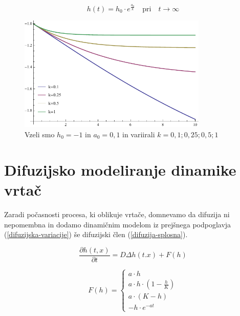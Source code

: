 \documentclass[a4paper, oneside, 12pt]{book}
\begin{document}
          \begin{equation}
            h(t) = h_0 \cdot e^{\frac{a_0}{k}} \quad \text{pri} \quad t \rightarrow \infty
            \label{dinamicna-gompertzova-limita}
          \end{equation}

            \begin{figure}[H]
              \begin{center}
                \includegraphics[width=9cm]{slike/gompertzova-rast}
              \end{center}
              \caption{Vzeli smo $h_0=-1$ in $a_0=0,1$ in variirali $k=0,1;0,25;0,5;1$}
              \label{fig:gompertzova-rast}
            \end{figure}

            \section{Difuzijsko modeliranje dinamike vrtač}

            Zaradi počasnosti procesa, ki oblikuje vrtače, domnevamo da difuzija ni nepomembna in dodamo dinamičnim modelom iz prejšnega podpoglavja  (\ref{difuzijska-variacije}) še difuzijski člen (\ref{difuzija-splosna}).

            \begin{equation}
              \frac{ \partial h(t,x) }{ \partial t} = D \Delta h(t.x) + F(h)
              \label{difuzija-splosna}
            \end{equation}

          \begin{equation}
            F(h) = \left \{ \begin{array}{lr} 
            a \cdot h \\
            a \cdot h \cdot (1 - \frac{h}{K}) \\
            a \cdot (K - h) \\
            - h \cdot e^{-a t}
            \end{array} \right. 
            \label{difuzijska-variacije}
          \end{equation}
\end{document}
